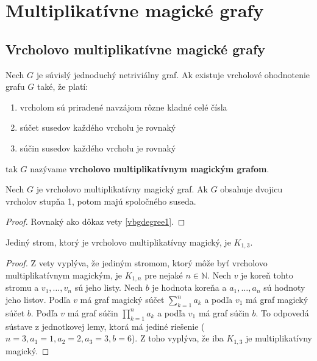 \section{Multiplikatívne magické grafy}

\subsection{Vrcholovo multiplikatívne magické grafy}

\begin{definition} Nech $G$ je súvislý jednoduchý netriviálny graf. Ak existuje vrcholové ohodnotenie grafu $G$ také, že platí:

\begin{enumerate}
\item vrcholom sú priradené navzájom rôzne kladné celé čísla
\item súčet susedov každého vrcholu je rovnaký
\item súčin susedov každého vrcholu je rovnaký
\end{enumerate}

tak $G$ nazývame \textbf{vrcholovo multiplikatívnym magickým grafom}.
\end{definition} 

\begin{theorem}
\label{vmmgdegree1}
Nech $G$ je vrcholovo multiplikatívny magický graf. Ak $G$ obsahuje dvojicu vrcholov stupňa 1, potom majú spoločného suseda.
\end{theorem}

\begin{proof} Rovnaký ako dôkaz vety \ref{vbgdegree1}.
\end{proof}

\begin{consequence} Jediný strom, ktorý je vrcholovo multiplikatívny magický, je $K_{1,3}$.
\end{consequence}

\begin{proof} Z vety \label{vmmgdegree1} vyplýva, že jediným stromom, ktorý môže byť vrcholovo multiplikatívnym magickým, je $K_{1,n}$ pre nejaké $n \in \mathbb{N}$. Nech $v$ je koreň tohto stromu a $v_1, \dots , v_n$ sú jeho listy. Nech $b$ je hodnota koreňa a $a_1, \dots , a_n$ sú hodnoty jeho listov. Podľa $v$ má graf magický súčet $\sum_{k=1}^{n} a_k$ a podľa $v_1$ má graf magický súčet $b$. Podľa $v$ má graf súčin $\prod_{k=1}^{n} a_k$ a podľa $v_1$ má graf súčin $b$. To odpovedá sústave z jednotkovej lemy, ktorá má jediné riešenie ($n = 3, a_1 = 1, a_2 = 2, a_3 = 3, b = 6$). Z toho vyplýva, že iba $K_{1,3}$ je multiplikatívny magický.
\end{proof}

